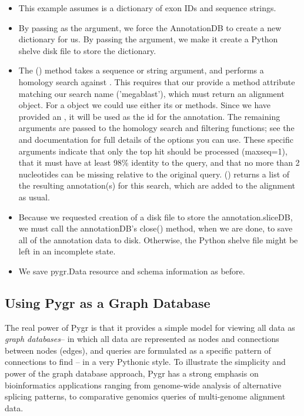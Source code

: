 \documentclass{howto}
\begin{document}
\begin{itemize}
\item This example assumes  is a dictionary of exon IDs and sequence
strings.

\item By passing  as the  argument, we force the
AnnotationDB to create a new dictionary for us.  By passing the 
argument, we make it create a Python shelve disk file to store the dictionary.

\item The () method takes a sequence or string argument,
and performs a homology search against .  This requires that
our  provide a method attribute matching our search name
('megablast'), which must return an alignment object.  For a 
object we could use either its  or  methods.
Since we have provided an , it will be used as
the id for the annotation.  The remaining arguments are passed to the
homology search and filtering functions; see the  and
 documentation for full details of the options you
can use.  These specific arguments indicate that only the top hit should
be processed (maxseq=1), that it must have at least 98\% identity to the
query, and that no more than 2 nucleotides can be missing relative to the 
original query.  () returns a list of the resulting
annotation(s) for this search, which are added to the alignment as usual.

\item Because we requested creation of a disk file to store the annotation.sliceDB,
we must call the annotationDB's close() method, when we are done, to 
save all of the annotation data to disk.  Otherwise, the Python shelve file might be
left in an incomplete state.

\item We save pygr.Data resource and schema information as before.

\end{itemize}

\subsection{Using Pygr as a Graph Database}
The real power of Pygr is that it provides a simple model for viewing
all data as {\em graph databases}-- in which all data are represented
as nodes and connections between nodes (edges), and queries are formulated
as a specific pattern of connections to find --
in a very Pythonic style.  To illustrate the simplicity and power
of the graph database approach, Pygr has a strong emphasis
on bioinformatics applications ranging from genome-wide analysis of
alternative splicing patterns, to comparative genomics queries of
multi-genome alignment data.
\end{document}
